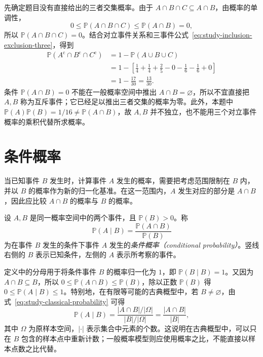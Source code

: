 \documentclass[UTF8,12pt,a4paper,fontset=fandol]{ctexbook}
\begin{document}
\begin{solve}
先确定题目没有直接给出的三者交集概率。由于 $A\cap B\cap C\subseteq A\cap B$，由概率的单调性，
\[
  0\le\mathbb P(A\cap B\cap C)\le\mathbb P(A\cap B)=0,
\]
所以 $\mathbb P(A\cap B\cap C)=0$。结合对立事件关系和三事件公式~\eqref{eq:study-inclusion-exclusion-three}，得到
\begin{equation}
  \begin{aligned}
    \mathbb P(A^{\mathrm c}\cap B^{\mathrm c}\cap C^{\mathrm c})
      &=1-\mathbb P(A\cup B\cup C)\\
      &=1-\left[\frac14+\frac14+\frac25-0-\frac16-\frac16+0\right]\\
      &=1-\frac{17}{30}=\boxed{\frac{13}{30}}.
  \end{aligned}
  \label{eq:study-inclusion-exclusion-example-answer}
\end{equation}
条件 $\mathbb P(A\cap B)=0$ 不能在一般概率空间中推出 $A\cap B=\varnothing$，所以不宜直接把 $A,B$ 称为互斥事件；它已经足以推出三者交集的概率为零。此外，本题中 $\mathbb P(A)\mathbb P(B)=1/16\ne\mathbb P(A\cap B)$，故 $A,B$ 并不独立，也不能用三个对立事件概率的乘积代替所求概率。
\end{solve}

\section{条件概率}
\label{sec:study-conditional-probability}

当已知事件 $B$ 发生时，计算事件 $A$ 发生的概率，需要把考虑范围限制在 $B$ 内，并以 $B$ 的概率作为新的归一化基准。在这一范围内，$A$ 发生对应的部分是 $A\cap B$，因此应比较 $A\cap B$ 的概率与 $B$ 的概率。

\begin{definition}
\label{def:study-conditional-probability}
设 $A,B$ 是同一概率空间中的两个事件，且 $\mathbb P(B)>0$。称
\begin{equation}
  \mathbb P(A\mid B)
    =\frac{\mathbb P(A\cap B)}{\mathbb P(B)}
  \label{eq:study-conditional-probability}
\end{equation}
为在事件 $B$ 发生的条件下事件 $A$ 发生的\emph{条件概率（conditional probability）}。竖线右侧的 $B$ 表示已知条件，左侧的 $A$ 表示所考察的事件。
\end{definition}

定义中的分母用于将条件事件 $B$ 的概率归一化为 $1$，即 $\mathbb P(B\mid B)=1$。又因为 $A\cap B\subseteq B$，所以 $0\le\mathbb P(A\cap B)\le\mathbb P(B)$，除以正数 $\mathbb P(B)$ 得 $0\le\mathbb P(A\mid B)\le1$。特别地，在有限等可能的古典概型中，若 $B\ne\varnothing$，由式~\eqref{eq:study-classical-probability} 可得
\[
  \mathbb P(A\mid B)
    =\frac{|A\cap B|/|\Omega|}{|B|/|\Omega|}
    =\frac{|A\cap B|}{|B|},
\]
其中 $\Omega$ 为原样本空间，$|\cdot|$ 表示集合中元素的个数。这说明在古典概型中，可以只在 $B$ 包含的样本点中重新计数；一般概率模型则应使用概率之比，不能直接以样本点数之比代替。
\end{document}
